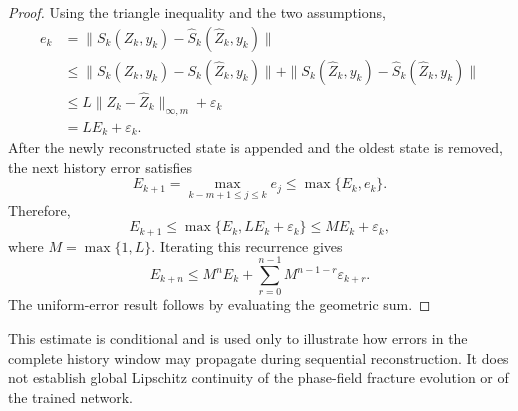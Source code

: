 \documentclass[10pt]{article}
\theoremstyle{definition}
\begin{document}
\begin{proof}
Using the triangle inequality and the two assumptions,
\[
\begin{aligned}
e_k
&=
\|S_k(Z_k,y_k)-\widehat{S}_k(\widehat{Z}_k,y_k)\|\\
&\leq
\|S_k(Z_k,y_k)-S_k(\widehat{Z}_k,y_k)\|
+
\|S_k(\widehat{Z}_k,y_k)
-\widehat{S}_k(\widehat{Z}_k,y_k)\|\\
&\leq
L\|Z_k-\widehat{Z}_k\|_{\infty,m}
+\varepsilon_k\\
&=
LE_k+\varepsilon_k.
\end{aligned}
\]
After the newly reconstructed state is appended and the oldest state is
removed, the next history error satisfies
\[
E_{k+1}
=
\max_{k-m+1\leq j\leq k}e_j
\leq
\max\{E_k,e_k\}.
\]
Therefore,
\[
E_{k+1}
\leq
\max\{E_k,LE_k+\varepsilon_k\}
\leq
ME_k+\varepsilon_k,
\]
where $M=\max\{1,L\}$. Iterating this recurrence gives
\[
E_{k+n}
\leq
M^nE_k
+
\sum_{r=0}^{n-1}M^{n-1-r}\varepsilon_{k+r}.
\]
The uniform-error result follows by evaluating the geometric sum.
\end{proof}

This estimate is conditional and is used only to illustrate how errors in
the complete history window may propagate during sequential reconstruction.
It does not establish global Lipschitz continuity of the phase-field fracture
evolution or of the trained network.

\printbibliography
% 
% 
\end{document}
